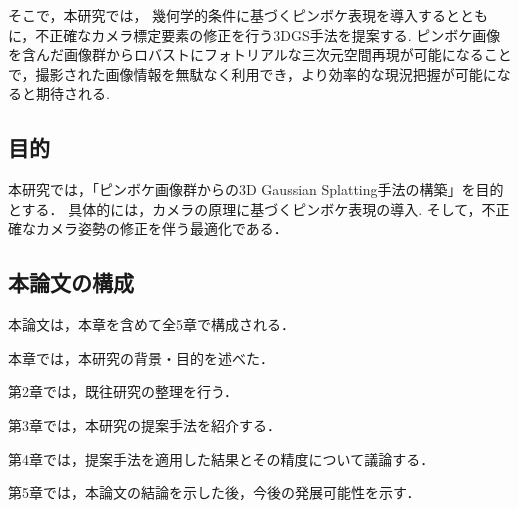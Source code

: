 そこで，本研究では， 幾何学的条件に基づくピンボケ表現を導入するとともに，不正確なカメラ標定要素の修正を行う3DGS手法を提案する.
ピンボケ画像を含んだ画像群からロバストにフォトリアルな三次元空間再現が可能になることで，撮影された画像情報を無駄なく利用でき，より効率的な現況把握が可能になると期待される.\par

\subsection{目的}\label{subsec:objective}

本研究では，「ピンボケ画像群からの3D Gaussian Splatting手法の構築」を目的とする．
具体的には，カメラの原理に基づくピンボケ表現の導入.
そして，不正確なカメラ姿勢の修正を伴う最適化である．

\subsection{本論文の構成}\label{subsec:construction}

本論文は，本章を含めて全5章で構成される．

本章では，本研究の背景・目的を述べた．

第2章では，既往研究の整理を行う．

第3章では，本研究の提案手法を紹介する．

第4章では，提案手法を適用した結果とその精度について議論する．

第5章では，本論文の結論を示した後，今後の発展可能性を示す．